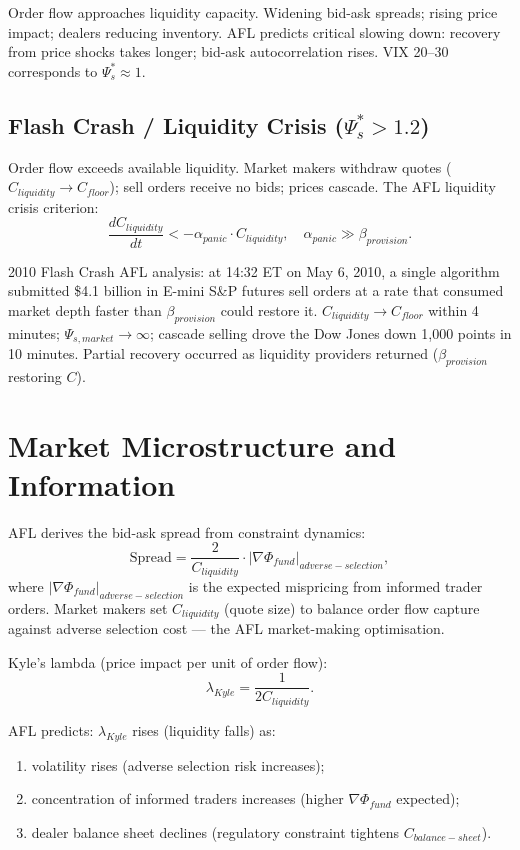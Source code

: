 \documentclass[11pt]{article}
\begin{document}
Order flow approaches liquidity capacity. Widening bid-ask spreads; rising price impact; dealers
reducing inventory. AFL predicts critical slowing down: recovery from price shocks takes longer;
bid-ask autocorrelation rises. VIX 20--30 corresponds to $\Psi_s^* \approx 1$.

\subsection{Flash Crash / Liquidity Crisis ($\Psi_s^* > 1.2$)}

Order flow exceeds available liquidity. Market makers withdraw quotes ($C_{liquidity} \to
C_{floor}$); sell orders receive no bids; prices cascade. The AFL liquidity crisis criterion:
\begin{equation}
\frac{dC_{liquidity}}{dt} < -\alpha_{panic} \cdot C_{liquidity}, \quad \alpha_{panic} \gg \beta_{provision}.
\end{equation}

2010 Flash Crash AFL analysis: at 14:32 ET on May 6, 2010, a single algorithm submitted
\$4.1 billion in E-mini S\&P futures sell orders at a rate that consumed market depth faster
than $\beta_{provision}$ could restore it. $C_{liquidity} \to C_{floor}$ within 4 minutes;
$\Psi_{s,market} \to \infty$; cascade selling drove the Dow Jones down 1,000 points in 10 minutes.
Partial recovery occurred as liquidity providers returned ($\beta_{provision}$ restoring $C$).

\section{Market Microstructure and Information}

AFL derives the bid-ask spread from constraint dynamics:
\begin{equation}
\text{Spread} = \frac{2}{C_{liquidity}} \cdot |\nabla\Phi_{fund}|_{adverse-selection},
\end{equation}
where $|\nabla\Phi_{fund}|_{adverse-selection}$ is the expected mispricing from informed trader
orders. Market makers set $C_{liquidity}$ (quote size) to balance order flow capture against
adverse selection cost --- the AFL market-making optimisation.

Kyle's lambda (price impact per unit of order flow):
\begin{equation}
\lambda_{Kyle} = \frac{1}{2C_{liquidity}}.
\end{equation}

AFL predicts: $\lambda_{Kyle}$ rises (liquidity falls) as:
\begin{enumerate}
    \item volatility rises (adverse selection risk increases);
    \item concentration of informed traders increases (higher $\nabla\Phi_{fund}$ expected);
    \item dealer balance sheet declines (regulatory constraint tightens $C_{balance-sheet}$).
\end{enumerate}
\end{document}
